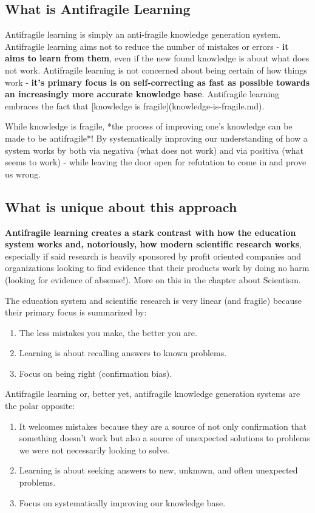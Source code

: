 \documentclass{article}
\begin{document}
\subsection{What is Antifragile Learning}

Antifragile learning is simply an anti-fragile knowledge generation system. Antifragile learning aims not to reduce the number of mistakes or errors - \textbf{it aims to learn from them}, even if the new found knowledge is about what does not work. Antifragile learning is not concerned about being certain of how things work - \textbf{it's primary focus is on self-correcting as fast as possible towards an increasingly more accurate knowledge base}. Antifragile learning embraces the fact that [knowledge is fragile](knowledge-is-fragile.md).

While knowledge is fragile, *the process of improving one's knowledge can be made to be antifragile*! By systematically improving our understanding of how a system works by both via negativa (what does not work) and via positiva (what seems to work) - while leaving the door open for refutation to come in and prove us wrong.

\subsection{What is unique about this approach}

\textbf{Antifragile learning creates a stark contrast with how the education system works and, notoriously, how modern scientific research works}, especially if said research is heavily sponsored by profit oriented companies and organizations looking to find evidence that their products work by doing no harm (looking for evidence of absense!). More on this in the chapter about Scientism.

The education system and scientific research is very linear (and fragile) because their primary focus is summarized by:
\begin{enumerate}
	\item The less mistakes you make, the better you are.
	\item Learning is about recalling answers to known problems.
	\item Focus on being right (confirmation bias).
\end{enumerate}


Antifragile learning or, better yet, antifragile knowledge generation systems are the polar opposite:
\begin{enumerate}
	\item It welcomes mistakes because they are a source of not only confirmation that something doesn't work but also a source of unexpected solutions to problems we were not necessarily looking to solve.
	\item Learning is about seeking answers to new, unknown, and often unexpected problems.
	\item Focus on systematically improving our knowledge base.
\end{enumerate}
\end{document}
